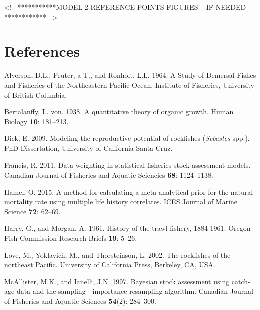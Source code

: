 \documentclass[12pt,]{article}
\begin{document}
\FloatBarrier

\FloatBarrier

\FloatBarrier

\FloatBarrier

\FloatBarrier

\FloatBarrier

\FloatBarrier
<!-- ***********MODEL 2 REFERENCE POINTS FIGURES  -- IF NEEDED ************ -->

\newpage

\color{black}

\section*{References}\label{references}

\renewcommand{\thepage}{}

\hypertarget{refs}{}
\hypertarget{ref-Alverson1964}{}
Alverson, D.L., Pruter, a T., and Ronholt, L.L. 1964. A Study of
Demersal Fishes and Fisheries of the Northeastern Pacific Ocean.
Institute of Fisheries, University of British Columbia.

\hypertarget{ref-vonB1938}{}
Bertalanffy, L. von. 1938. A quantitative theory of organic growth.
Human Biology \textbf{10}: 181--213.

\hypertarget{ref-Dick2009}{}
Dick, E. 2009. Modeling the reproductive potential of rockfishes
(\emph{Sebastes} spp.). PhD Dissertation, University of California Santa
Cruz.

\hypertarget{ref-Francis2011}{}
Francis, R. 2011. Data weighting in statistical fisheries stock
assessment models. Canadian Journal of Fisheries and Aquatic Sciencies
\textbf{68}: 1124--1138.

\hypertarget{ref-Hamel2015}{}
Hamel, O. 2015. A method for calculating a meta-analytical prior for the
natural mortality rate using multiple life history correlates. ICES
Journal of Marine Science \textbf{72}: 62--69.

\hypertarget{ref-Harry1961}{}
Harry, G., and Morgan, A. 1961. History of the trawl fishery, 1884-1961.
Oregon Fish Commission Research Briefs \textbf{19}: 5--26.

\hypertarget{ref-Love2002}{}
Love, M., Yoklavich, M., and Thorsteinson, L. 2002. The rockfishes of
the northeast Pacific. University of California Press, Berkeley, CA,
USA.

\hypertarget{ref-McAllister1997}{}
McAllister, M.K., and Ianelli, J.N. 1997. Bayesian stock assessment
using catch-age data and the sampling - importance resampling algorithm.
Canadian Journal of Fisheries and Aquatic Sciences \textbf{54}(2):
284--300.
\end{document}

